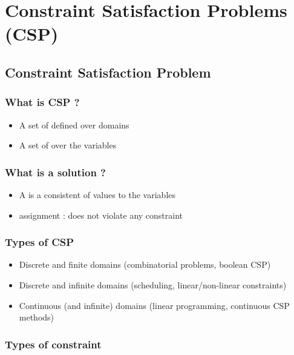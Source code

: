 \section{Constraint Satisfaction Problems (CSP)}

\subsection{Constraint Satisfaction Problem}

\subsubsection{What is CSP ?}

\begin{itemize}
\item A set of  defined over domains
\item A set of  over the variables
\end{itemize}

\subsubsection{What is a solution ?}

\begin{itemize}
\item A  is a consistent  of values to the variables
\item {} assignment : does not violate any constraint
\end{itemize}

\subsubsection{Types of CSP}

\begin{itemize}
\item Discrete and finite domains (combinatorial problems, boolean CSP)
\item Discrete and infinite domains (scheduling, linear/non-linear constraints)
\item Continuous (and infinite) domains (linear programming, continuous CSP methods)
\end{itemize}

\subsubsection{Types of constraint}

